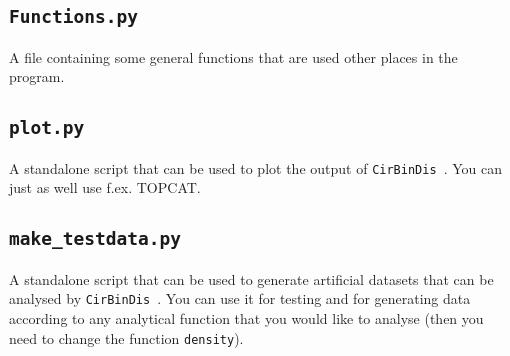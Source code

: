\documentclass[a4paper, 12pt, english, titlepage]{article}
\newcommand{\sname}{\texttt{CirBinDis }}
\begin{document}
\subsection{\texttt{Functions.py}}
    A file containing some general functions that are used other places in the program.
    

\subsection{\texttt{plot.py}}
    A standalone script that can be used to plot the output of \sname. You can just as well use f.ex. TOPCAT.
    

\subsection{\texttt{make\_testdata.py}}
    A standalone script that can be used to generate artificial datasets that can be analysed by \sname. You can use it for testing and for generating data according to any analytical function that you would like to analyse (then you need to change the function \texttt{density}).
    
\end{document}
